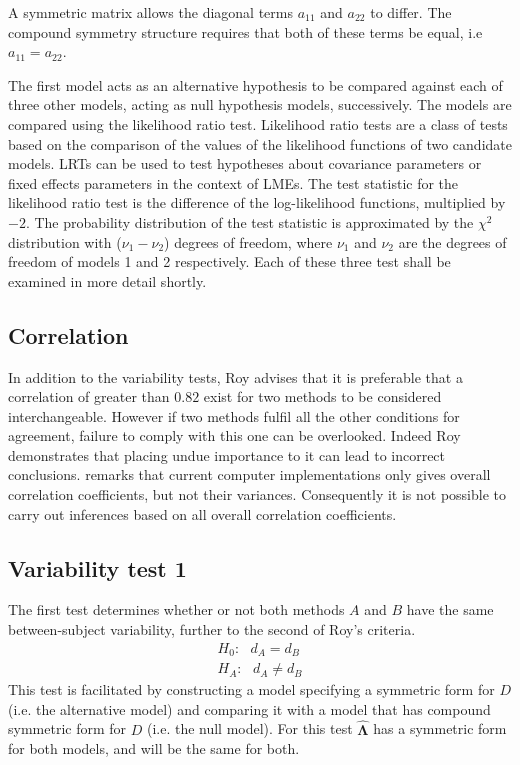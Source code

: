 \documentclass[12pt, a4paper]{article}
\theoremstyle{plain}
\theoremstyle{definition}
\theoremstyle{remark}
\begin{document}
A symmetric matrix allows the diagonal terms $a_{11}$ and $a_{22}$ to differ. The compound symmetry structure requires that both of these terms be equal, i.e $a_{11} = a_{22}$.

The first model acts as an alternative hypothesis to be compared against each of three other models, acting as null hypothesis models, successively. The models are compared using the likelihood ratio test. Likelihood ratio tests are a class of tests based on the comparison of the values of the likelihood functions of two candidate models. LRTs can be used to test hypotheses about covariance parameters or fixed effects parameters in the context of LMEs. The test statistic for the likelihood ratio test is the difference of the log-likelihood functions, multiplied by $-2$.
The probability distribution of the test statistic is approximated by the $\chi^2$ distribution with ($\nu_{1} - \nu_{2}$) degrees of freedom, where $\nu_{1}$ and $\nu_{2}$ are the degrees of freedom of models 1 and 2 respectively. Each of these three test shall be examined in more detail shortly.

\subsection{Correlation}
In addition to the variability tests, Roy advises that it is preferable that a correlation of greater than $0.82$ exist for two methods to be considered interchangeable. However if two methods fulfil all the other conditions for agreement, failure to comply with this one can be overlooked. Indeed Roy demonstrates that placing undue importance to it can lead to incorrect conclusions. \citet{roy} remarks that current computer implementations only gives overall correlation coefficients, but not their variances. Consequently it is not possible to carry out inferences based on all overall correlation coefficients.

\subsection{Variability test 1}
The first test determines whether or not both methods $A$ and $B$ have the same between-subject variability, further to the second of Roy's criteria.
\begin{eqnarray*}
H_{0}: \mbox{ }d_{A}  = d_{B} \\
H_{A}: \mbox{ }d_{A}  \neq d_{B}
\end{eqnarray*}
This test is facilitated by constructing a model specifying a symmetric form for $D$ (i.e. the alternative model) and comparing it with a model that has compound symmetric form for $D$ (i.e. the null model). For this test $\boldsymbol{\hat{\Lambda}}$ has a symmetric form for both models, and will be the same for both.
\end{document}
